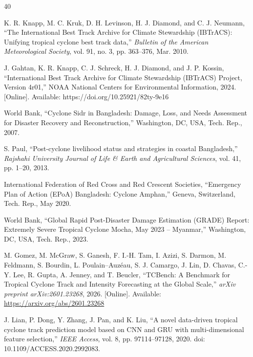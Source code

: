 \documentclass[conference]{IEEEtran}
\begin{document}

\begin{thebibliography}{40}

K. R. Knapp, M. C. Kruk, D. H. Levinson, H. J. Diamond, and C. J. Neumann, ``The International Best Track Archive for Climate Stewardship (IBTrACS): Unifying tropical cyclone best track data,'' \textit{Bulletin of the American Meteorological Society}, vol. 91, no. 3, pp. 363--376, Mar. 2010.

J. Gahtan, K. R. Knapp, C. J. Schreck, H. J. Diamond, and J. P. Kossin, ``International Best Track Archive for Climate Stewardship (IBTrACS) Project, Version 4r01,'' NOAA National Centers for Environmental Information, 2024. [Online]. Available: https://doi.org/10.25921/82ty-9e16

World Bank, ``Cyclone Sidr in Bangladesh: Damage, Loss, and Needs Assessment for Disaster Recovery and Reconstruction,'' Washington, DC, USA, Tech. Rep., 2007.

S. Paul, ``Post-cyclone livelihood status and strategies in coastal Bangladesh,'' \textit{Rajshahi University Journal of Life \& Earth and Agricultural Sciences}, vol. 41, pp. 1--20, 2013.

International Federation of Red Cross and Red Crescent Societies, ``Emergency Plan of Action (EPoA) Bangladesh: Cyclone Amphan,'' Geneva, Switzerland, Tech. Rep., May 2020.

World Bank, ``Global Rapid Post-Disaster Damage Estimation (GRADE) Report: Extremely Severe Tropical Cyclone Mocha, May 2023 -- Myanmar,'' Washington, DC, USA, Tech. Rep., 2023.


M. Gomez, M. McGraw, S. Ganesh, F. I.-H. Tam, I. Azizi, S. Darmon, M. Feldmann, S. Bourdin, L. Poulain--Auz\'{e}au, S. J. Camargo, J. Lin, D. Chavas, C.-Y. Lee, R. Gupta, A. Jenney, and T. Beucler, ``TCBench: A Benchmark for Tropical Cyclone Track and Intensity Forecasting at the Global Scale,'' \textit{arXiv preprint arXiv:2601.23268}, 2026. [Online]. Available: \url{https://arxiv.org/abs/2601.23268}

J. Lian, P. Dong, Y. Zhang, J. Pan, and K. Liu, ``A novel data-driven tropical cyclone track prediction model based on CNN and GRU with multi-dimensional feature selection,'' \textit{IEEE Access}, vol. 8, pp. 97114--97128, 2020. doi: 10.1109/ACCESS.2020.2992083.


\end{thebibliography}
\end{document}

